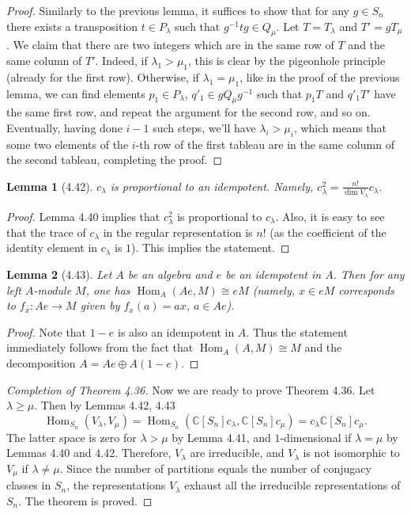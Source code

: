 \documentclass[UTF8,11pt]{ctexart}
\newtheorem*{lemma}{Lemma}
\theoremstyle{definition}
\newcommand{\C}{\mathbb C}
\DeclareMathOperator{\Hom}{Hom}
\begin{document}
\begin{proof}
Similarly to the previous lemma, it suffices to show that for any $g\in S_n$ there exists a transposition $t\in P_\lambda$ such that $g^{-1}tg\in Q_\mu$. Let $T=T_\lambda$ and $T'=gT_\mu$. We claim that there are two integers which are in the same row of $T$ and the same column of $T'$. Indeed, if $\lambda_1>\mu_1$, this is clear by the pigeonhole principle (already for the first row). Otherwise, if $\lambda_1=\mu_1$, like in the proof of the previous lemma, we can find elements $p_1\in P_\lambda$, $q'_1\in gQ_\mu g^{-1}$ such that $p_1T$ and $q'_1T'$ have the same first row, and repeat the argument for the second row, and so on. Eventually, having done $i-1$ such steps, we'll have $\lambda_i>\mu_i$, which means that some two elements of the $i$-th row of the first tableau are in the same column of the second tableau, completing the proof.
\end{proof}
\begin{lemma}[4.42]
$c_\lambda$ is proportional to an idempotent. Namely, $c_\lambda^2=\frac{n!}{\dim V_\lambda}c_\lambda$.
\end{lemma}
\begin{proof}
Lemma 4.40 implies that $c_\lambda^2$ is proportional to $c_\lambda$. Also, it is easy to see that the trace of $c_\lambda$ in the regular representation is $n!$ (as the coefficient of the identity element in $c_\lambda$ is $1$). This implies the statement.
\end{proof}
\begin{lemma}[4.43]
Let $A$ be an algebra and $e$ be an idempotent in $A$. Then for any left $A$-module $M$, one has $\Hom_A(Ae,M)\cong eM$ (namely, $x\in eM$ corresponds to $f_x:Ae\to M$ given by $f_x(a)=ax$, $a\in Ae$).
\end{lemma}
\begin{proof}
Note that $1-e$ is also an idempotent in $A$. Thus the statement immediately follows from the fact that $\Hom_A(A,M)\cong M$ and the decomposition $A=Ae\oplus A(1-e)$.
\end{proof}
\begin{proof}[Completion of Theorem 4.36]
Now we are ready to prove Theorem 4.36. Let $\lambda\geq\mu$. Then by Lemmas 4.42, 4.43
\[
\Hom_{S_n}(V_\lambda,V_\mu)
=\Hom_{S_n}(\C[S_n]c_\lambda,\C[S_n]c_\mu)
=c_\lambda\C[S_n]c_\mu.
\]
The latter space is zero for $\lambda>\mu$ by Lemma 4.41, and $1$-dimensional if $\lambda=\mu$ by Lemmas 4.40 and 4.42. Therefore, $V_\lambda$ are irreducible, and $V_\lambda$ is not isomorphic to $V_\mu$ if $\lambda\ne\mu$. Since the number of partitions equals the number of conjugacy classes in $S_n$, the representations $V_\lambda$ exhaust all the irreducible representations of $S_n$. The theorem is proved.
\end{proof}
\end{document}
